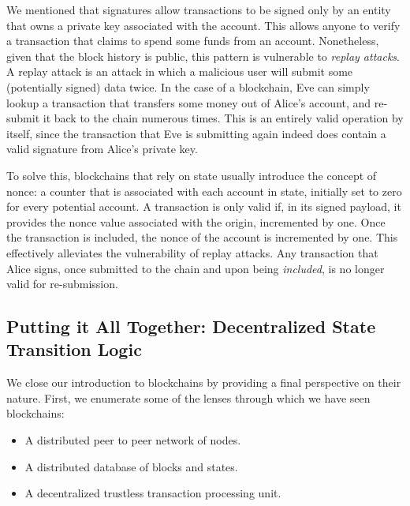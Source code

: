 We mentioned that signatures allow transactions to be signed only by an entity that owns a private
key associated with the account. This allows anyone to verify a transaction that claims to spend
some funds from an account. Nonetheless, given that the block history is public, this pattern is
vulnerable to \textit{replay attacks}. A replay attack is an attack in which a malicious user will
submit some (potentially signed) data twice. In the case of a blockchain, Eve can simply lookup a
transaction that transfers some money out of Alice's account, and re-submit it back to the chain
numerous times. This is an entirely valid operation by itself, since the transaction that Eve is
submitting again indeed does contain a valid signature from Alice's private key.

To solve this, blockchains that rely on state usually introduce the concept of nonce: a counter that
is associated with each account in state, initially set to zero for every potential account. A
transaction is only valid if, in its signed payload, it provides the nonce value associated with the
origin, incremented by one. Once the transaction is included, the nonce of the account is
incremented by one. This effectively alleviates the vulnerability of replay attacks. Any transaction
that Alice signs, once submitted to the chain and upon being \textit{included}, is no longer valid
for re-submission.

\subsection{Putting it All Together: Decentralized State Transition Logic}
\label{chap_bg:subsec:decentralized_state_machine}

We close our introduction to blockchains by providing a final perspective on their nature. First, we
enumerate some of the lenses through which we have seen blockchains:

\begin{itemize}
	\item A distributed peer to peer network of nodes.
	\item A distributed database of blocks and states.
	\item A decentralized trustless transaction processing unit.
\end{itemize}

